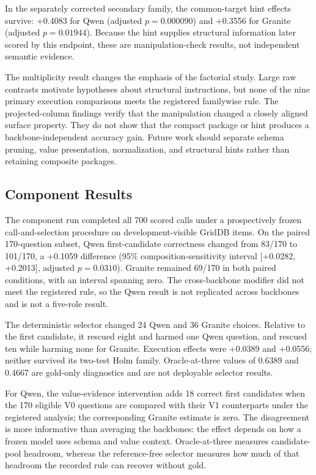 \documentclass[applsci,article,submit,moreauthors]{Definitions/mdpi}
\begin{document}
In the separately corrected secondary family, the common-target hint effects survive: +0.4083 for Qwen (adjusted $p=0.000090$) and +0.3556 for Granite (adjusted $p=0.01944$). Because the hint supplies structural information later scored by this endpoint, these are manipulation-check results, not independent semantic evidence.

The multiplicity result changes the emphasis of the factorial study. Large raw contrasts motivate hypotheses about structural instructions, but none of the nine primary execution comparisons meets the registered familywise rule. The projected-column findings verify that the manipulation changed a closely aligned surface property. They do not show that the compact package or hint produces a backbone-independent accuracy gain. Future work should separate schema pruning, value presentation, normalization, and structural hints rather than retaining composite packages.

\subsection{Component Results}

The component run completed all 700 scored calls under a prospectively frozen call-and-selection procedure on development-visible GridDB items. On the paired 170-question subset, Qwen first-candidate correctness changed from 83/170 to 101/170, a +0.1059 difference (95\% composition-sensitivity interval [+0.0282, +0.2013], adjusted $p=0.0310$). Granite remained 69/170 in both paired conditions, with an interval spanning zero. The cross-backbone modifier did not meet the registered rule, so the Qwen result is not replicated across backbones and is not a five-role result.

The deterministic selector changed 24 Qwen and 36 Granite choices. Relative to the first candidate, it rescued eight and harmed one Qwen question, and rescued ten while harming none for Granite. Execution effects were +0.0389 and +0.0556; neither survived its two-test Holm family. Oracle-at-three values of 0.6389 and 0.4667 are gold-only diagnostics and are not deployable selector results.

For Qwen, the value-evidence intervention adds 18 correct first candidates when the 170 eligible V0 questions are compared with their V1 counterparts under the registered analysis; the corresponding Granite estimate is zero. The disagreement is more informative than averaging the backbones: the effect depends on how a frozen model uses schema and value context. Oracle-at-three measures candidate-pool headroom, whereas the reference-free selector measures how much of that headroom the recorded rule can recover without gold.
\end{document}

